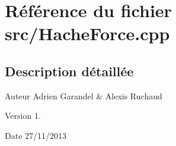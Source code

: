 \section{Référence du fichier src/\-Hache\-Force.cpp}
\label{_hache_force_8cpp}


\subsection{Description détaillée}
\begin{DoxyAuthor}{Auteur}
Adrien Garandel \& Alexis Ruchaud 
\end{DoxyAuthor}
\begin{DoxyVersion}{Version}
1. 
\end{DoxyVersion}
\begin{DoxyDate}{Date}
27/11/2013 
\end{DoxyDate}
